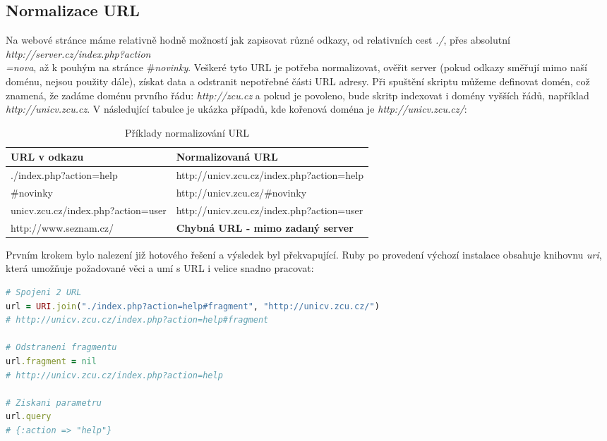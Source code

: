 \subsection{Normalizace URL}
Na webové stránce máme relativně hodně možností jak zapisovat různé odkazy, od relativních cest \textit{./}, přes absolutní \textit{http://server.cz/index.php?action\\=nova}, až k pouhým  na stránce \textit{$\#$novinky}. Veškeré tyto URL je potřeba normalizovat, ověřit server (pokud odkazy směřují mimo naší doménu, nejsou použity dále), získat data a odstranit nepotřebné části URL adresy. Při spuštění skriptu můžeme definovat  domén, což znamená, že zadáme doménu prvního řádu: \textit{http://zcu.cz} a pokud je povoleno, bude skritp indexovat i domény vyšších řádů, například \textit{http://unicv.zcu.cz}. V následující tabulce je ukázka případů, kde kořenová doména je \textit{http://unicv.zcu.cz/}:

\begin{table}
\centering
\begin{tabular}{|l|l|}
\hline
\bf URL v odkazu & \bf Normalizovaná URL \\
\hline
\hline
./index.php?action=help &  http://unicv.zcu.cz/index.php?action=help \\
\hline
$\#$novinky & http://unicv.zcu.cz/$\#$novinky \\
\hline
unicv.zcu.cz/index.php?action=user & http://unicv.zcu.cz/index.php?action=user \\
\hline
http://www.seznam.cz/ & \bf Chybná URL - mimo zadaný server \\
\hline
\end{tabular}
\label{tab:url}
\caption{Příklady normalizování URL}
\end{table}
\newpage
Prvním krokem bylo nalezení již hotového řešení a výsledek byl překvapující. Ruby po provedení výchozí instalace obsahuje knihovnu \textit{uri}, která umožňuje požadované věci a umí s URL i velice snadno pracovat:

\begin{lstlisting}[label=equals_classes,language=Ruby, caption=Normalizování URL pomocí třídy URI]
# Spojeni 2 URL
url = URI.join("./index.php?action=help#fragment", "http://unicv.zcu.cz/") 
# http://unicv.zcu.cz/index.php?action=help#fragment

# Odstraneni fragmentu
url.fragment = nil
# http://unicv.zcu.cz/index.php?action=help

# Ziskani parametru
url.query
# {:action => "help"}
\end{lstlisting}


